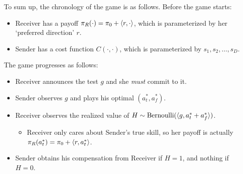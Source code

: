 \noindent To sum up, the chronology of the game is as follows.
Before the game starts:
\begin{itemize}[nosep]
    \item Receiver has a payoff $\pi_R(\cdot)=\pi_0+\langle r,\cdot\rangle$, which is parameterized by her `preferred direction' $r$.
    \item Sender has a cost function $C(\cdot,\cdot)$, which is parameterized by $s_1,s_2,\dots,s_D$.
\end{itemize}

\noindent The game progresses as follows:
\begin{itemize}[nosep]
    \item Receiver announces the test $g$ and she \textit{must} commit to it.
    \item Sender observes $g$ and plays his optimal $(a_t^*,a_f^*)$.
    \item Receiver observes the realized value of $H \sim \text{Bernoulli}(\langle g,a^*_t+a_f^*\rangle)$.
    \begin{itemize}[nosep]
        \item Receiver only cares about Sender's true skill, so her payoff is actually $\pi_R(a_t^*)=\pi_0+\langle r,a_t^*\rangle$.
    \end{itemize}
    \item Sender obtains his compensation from Receiver if $H=1$, and nothing if $H=0$.
\end{itemize}
